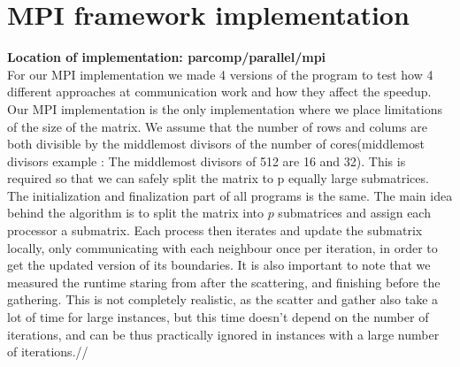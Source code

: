 \documentclass[11pt]{article}
\begin{document}
\section{MPI framework implementation}
\textbf{Location of implementation: parcomp/parallel/mpi}\\
For our MPI implementation we made 4 versions of the program to test how 4 different approaches at communication work and how they affect the speedup.
Our MPI implementation is the only implementation where we place limitations of the size of the matrix. We assume that the number of rows and colums
are both divisible by the middlemost divisors of the number of cores(middlemost divisors example : The middlemost divisors of 512 are
16 and 32). This is required so that we can safely split the matrix to p equally large submatrices.
The initialization and finalization part of all programs is the same. The main idea behind the algorithm is to split the matrix into $p$ submatrices and assign
each processor a submatrix. Each process then iterates and update the submatrix locally, only communicating with each neighbour once per iteration, in order to
get the updated version of its boundaries. It is also important to note that we measured the runtime staring from after the scattering, and finishing before the gathering.
This is not completely realistic, as the scatter and gather also take a lot of time for large instances, but this time doesn't depend on the number of iterations, and can be thus
practically ignored in instances with a large number of iterations.//
\end{document}
